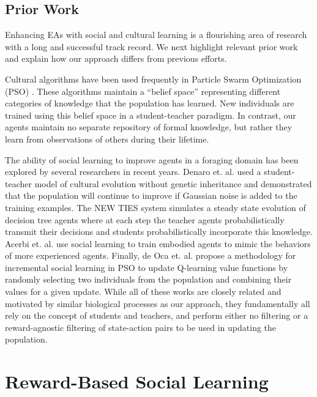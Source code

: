 \documentclass{acm_proc_article-sp}
\begin{document}
\subsection*{Prior Work}

Enhancing EAs with social and cultural learning is a flourishing area of research with a long and successful track record. We next highlight relevant prior work and explain how our approach differs from previous efforts.

Cultural algorithms \cite{reynolds1994introduction} have been used frequently in Particle Swarm Optimization (PSO) \cite{kennedy1995particle}. These algorithms maintain a ``belief space'' representing different categories of knowledge that the population has learned. New individuals are trained using this belief space in a student-teacher paradigm. In contrast, our agents maintain no separate repository of formal knowledge, but rather they learn from observations of others during their lifetime.

The ability of social learning to improve agents in a foraging domain has been explored by several researchers in recent years. Denaro et. al. \cite{denaro1996cultural} used a student-teacher model of cultural evolution without genetic inheritance and demonstrated that the population will continue to improve if Gaussian noise is added to the training examples. The NEW TIES system \cite{haasdijk2008social, vogt2010modeling} simulates a steady state evolution of decision tree agents where at each step the teacher agents probabilistically transmit their decisions and students probabilistically incorporate this knowledge. Acerbi et. al. \cite{acerbi2007social} use social learning to train embodied agents to mimic the behaviors of more experienced agents. Finally, de Oca et. al. \cite{de2011incremental} propose a methodology for incremental social learning in PSO to update Q-learning \cite{watkins1992q} value functions by randomly selecting two individuals from the population and combining their values for a given update. While all of these works are closely related and motivated by similar biological processes as our approach, they fundamentally all rely on the concept of students and teachers, and perform either no filtering or a reward-agnostic filtering of state-action pairs to be used in updating the population.


\section{Reward-Based Social Learning}
\label{sec:rbsl}
\end{document}
